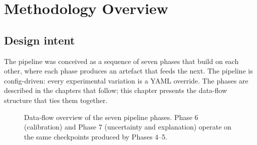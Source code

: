 \documentclass[../preamble.tex]{subfiles}
\begin{document}
\chapter{Methodology Overview}
\label{ch:method-overview}

\section{Design intent}
\label{sec:method-intent}

The \PEARL{} pipeline was conceived as a sequence of seven phases that build
on each other, where each phase produces an artefact that feeds the next.
The pipeline is config-driven: every experimental variation is a YAML
override. The phases are described in the chapters that follow; this chapter
presents the data-flow structure that ties them together.

\begin{figure}[htbp]
  \centering
  \caption{Data-flow overview of the seven pipeline phases. Phase 6 (calibration)
           and Phase 7 (uncertainty and explanation) operate on the same
           checkpoints produced by Phases 4--5.}
  \label{fig:pipeline-overview}
\end{figure}
\end{document}
